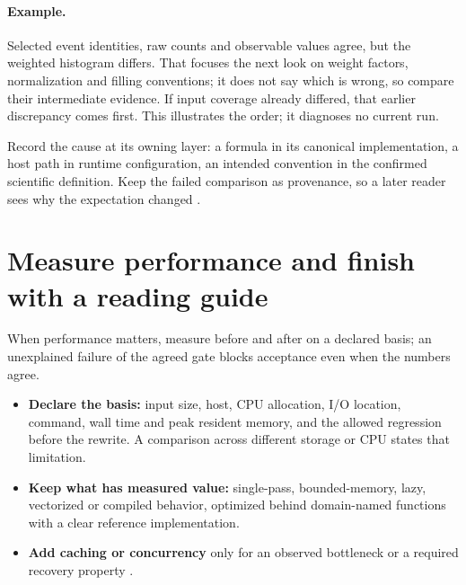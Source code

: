 \paragraph{Example.} Selected event identities, raw counts and observable values agree,
but the weighted histogram differs. That focuses the next look on weight factors,
normalization and filling conventions; it does not say which is wrong, so compare their
intermediate evidence. If input coverage already differed, that earlier discrepancy comes
first. This illustrates the order; it diagnoses no current run.

Record the cause at its owning layer: a formula in its canonical implementation, a host
path in runtime configuration, an intended convention in the confirmed scientific
definition. Keep the failed comparison as provenance, so a later reader sees why the
expectation changed \cites[Ownership and framework composition; Numerical
  evidence]{skill:implementation} [Source traceability and
  corroboration]{skill:report-production}.

\section{Measure performance and finish with a reading guide}

\begin{headline}
  When performance matters, measure before and after on a declared basis; an unexplained
  failure of the agreed gate blocks acceptance even when the numbers agree.
\end{headline}

\begin{itemize}
  \item \textbf{Declare the basis:} input size, host, CPU allocation, I/O location, command,
        wall time and peak resident memory, and the allowed regression before the rewrite.
        A comparison across different storage or CPU states that limitation.
  \item \textbf{Keep what has measured value:} single-pass, bounded-memory, lazy, vectorized
        or compiled behavior, optimized behind domain-named functions with a clear
        reference implementation.
  \item \textbf{Add caching or concurrency} only for an observed bottleneck or a required
        recovery property \cite[Performance]{skill:implementation}.
\end{itemize}

